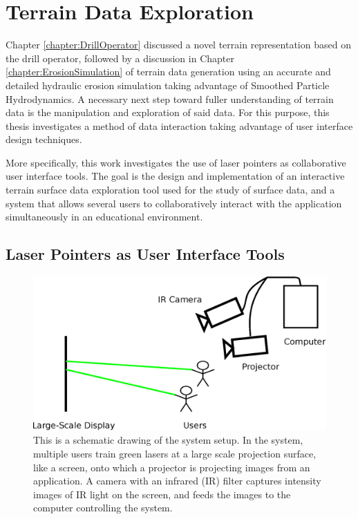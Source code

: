 \chapter{Terrain Data Exploration}
\label{chapter:TerrainDataExploration}

Chapter \ref{chapter:DrillOperator} discussed a novel terrain representation based on the drill operator, followed by a discussion in Chapter \ref{chapter:ErosionSimulation} of terrain data generation using an accurate and detailed hydraulic erosion simulation taking advantage of Smoothed Particle Hydrodynamics. A necessary next step toward fuller understanding of terrain data is the manipulation and exploration of said data. For this purpose, this thesis investigates a method of data interaction taking advantage of user interface design techniques. 

More specifically, this work investigates the use of laser pointers as collaborative user interface tools. The goal is the design and implementation of an interactive terrain surface data exploration tool used for the study of surface data, and a system that allows several users to collaboratively interact with the application simultaneously in an educational environment. 

\section{Laser Pointers as User Interface Tools}


\begin{figure}[t]
  \includegraphics[width=1.0\textwidth]{images/Camera_Setup.eps}
  \caption[Schematic of laser interaction system setup]{\label{figure:LaserSetupSchematic}This is a schematic drawing of the system setup. In the system, multiple users train green lasers at a large scale projection surface, like a screen, onto which a projector is projecting images from an application. A camera with an infrared (IR) filter captures intensity images of IR light on the screen, and feeds the images to the computer controlling the system.}
\end{figure}



